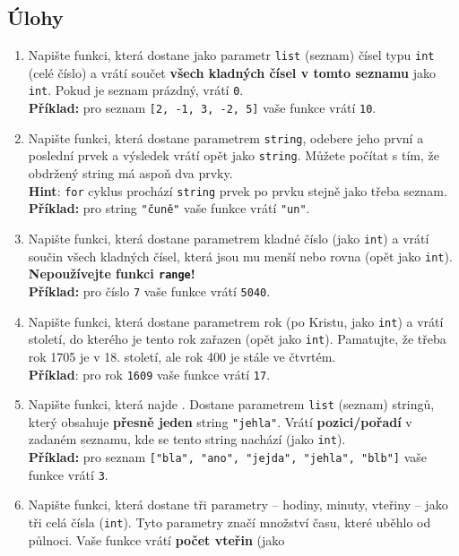 \documentclass[a4paper,11pt]{article}
\begin{document}
\subsection*{Úlohy}
\begin{enumerate}
 \item Napište funkci, která dostane jako parametr \texttt{list} (seznam) čísel
  typu \texttt{int} (celé číslo) a vrátí součet \textbf{všech kladných čísel v
  tomto seznamu} jako \texttt{int}. Pokud je seznam prázdný, vrátí \texttt{0}.\\
  \textbf{Příklad:} pro seznam \texttt{[2, -1, 3, -2, 5]} vaše funkce vrátí
  \texttt{10}.
 \item Napište funkci, která dostane parametrem \texttt{string}, odebere jeho
  první a poslední prvek a výsledek vrátí opět jako \texttt{string}. Můžete
  počítat s tím, že obdržený string má aspoň dva prvky.\\
  \textbf{Hint}: \texttt{for} cyklus prochází \texttt{string} prvek po prvku
  stejně jako třeba seznam.
  \textbf{Příklad:} pro string \texttt{"čuně"} vaše funkce vrátí \texttt{"un"}.
 \item Napište funkci, která dostane parametrem kladné číslo (jako \texttt{int})
  a vrátí součin všech kladných čísel, která jsou mu menší nebo rovna (opět jako
  \texttt{int}). \textbf{Nepoužívejte funkci \texttt{range}!}\\
  \textbf{Příklad:} pro číslo \texttt{7} vaše funkce vrátí \texttt{5040}.
 \item Napište funkci, která dostane parametrem rok (po Kristu, jako
  \texttt{int}) a vrátí století, do kterého je tento rok zařazen (opět jako
  \texttt{int}). Pamatujte, že třeba rok 1705 je v 18. století, ale rok 400 je
  stále ve čtvrtém.\\
  \textbf{Příklad}: pro rok \texttt{1609} vaše funkce vrátí \texttt{17}.
 \item Napište funkci, která najde . Dostane parametrem
  \texttt{list} (seznam) stringů, který obsahuje \textbf{přesně jeden} string
  \texttt{"jehla"}. Vrátí \textbf{pozici/pořadí} v zadaném seznamu, kde se tento
  string nachází (jako \texttt{int}).\\
  \textbf{Příklad:} pro seznam \texttt{["bla", "ano", "jejda", "jehla", "blb"]}
  vaše funkce vrátí \texttt{3}.
 \item Napište funkci, která dostane tři parametry -- hodiny, minuty, vteřiny --
  jako tři celá čísla (\texttt{int}). Tyto parametry značí množství času, které
  uběhlo od půlnoci. Vaše funkce vrátí \textbf{počet vteřin} (jako

\end{enumerate}
\end{document}

